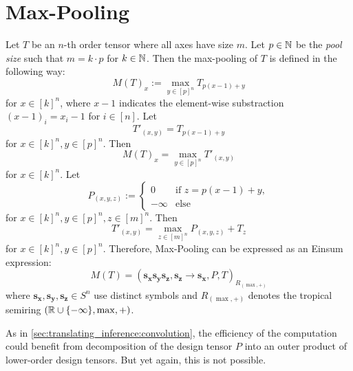 \section{Max-Pooling}

Let $T$ be an $n$-th order tensor where all axes have size $m$.
Let $p \in \mathbb{N}$ be the \textit{pool size} such that $m = k \cdot p$ for $k \in \mathbb{N}$.
Then the max-pooling of $T$ is defined in the following way:
$$M(T)_{x} := \max\limits_{y \in [p]^n} T_{p (x - 1) + y}$$
for $x \in [k]^n$, where $x - 1$ indicates the element-wise substraction $(x - 1)_i = x_i - 1$ for $i \in [n]$.
Let
$$T'_{(x,y)} = T_{p (x - 1) + y}$$
for $x \in [k]^n, y \in [p]^n$.
Then
$$M(T)_{x} = \max\limits_{y \in [p]^n} T'_{(x,y)}$$
for $x \in [k]^n$. Let
$$P_{(x,y,z)} := \begin{cases}
        0       & \text{if $z = p (x - 1) + y$}, \\
        -\infty & \text{else}
    \end{cases}$$
for $x \in [k]^n, y \in [p]^n, z \in [m]^n$.
Then
$$T'_{(x,y)} = \max\limits_{z \in [m]^n} P_{(x,y,z)} + T_{z}$$
for $x \in [k]^n, y \in [p]^n$.
Therefore, Max-Pooling can be expressed as an Einsum expression:
$$M(T) = (\bm{s_x}\bm{s_y}\bm{s_z}, \bm{s_z}  \rightarrow \bm{s_x}, P, T)_{R_{(\max, +)}}$$
where $\bm{s_x},\bm{s_y},\bm{s_z} \in S^n$ use distinct symbols and $R_{(\max, +)}$ denotes the tropical semiring $(\mathbb{R} \cup \lbrace -\infty \rbrace, \max, +)$.

As in \cref{sec:translating_inference:convolution}, the efficiency of the computation could benefit from decomposition of the design tensor $P$ into an outer product of lower-order design tensors.
But yet again, this is not possible.

